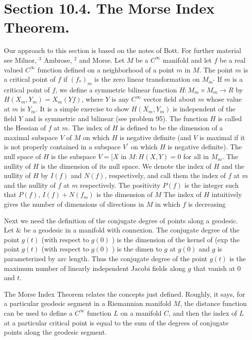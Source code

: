 \documentclass[10pt]{article}
\begin{document}
\section{Section 10.4. The Morse Index Theorem.}
Our approach to this section is based on the notes of Bott. For further material see Milnor, ${ }^{3}$ Ambrose, ${ }^{2}$ and Morse. Let $M$ be a $C^{\infty}$ manifold and let $f$ be a real valued $C^{\infty}$ function defined on a neighborhood of a point $m$ in $M$. The point $m$ is a critical point of $f$ if $\left(f_{*}\right)_{m}$ is the zero linear transformation on $M_{m^{*}}$ If $m$ is a critical point of $f$, we define a symmetric bilinear function $H: M_{m} \times M_{m} \rightarrow R$ by $H\left(X_{m}, Y_{m}\right)=X_{m}(Y f)$, where $Y$ is any $C^{\infty}$ vector field about $m$ whose value at $m$ is $Y_{m} .$ It is a simple exercise to show $H\left(X_{m}, Y_{m}\right)$ is independent of the field $Y$ and is symmetric and bilinear (see problem 95). The function $H$ is called the Hessian of $f$ at $m$. The index of $H$ is defined to be the dimension of a maximal subspace $V$ of $M$ on which $H$ is negative definite (and $V$ is maximal if it is not properly contained in a subspace $V^{\prime}$ on which $H$ is negative definite). The null space of $H$ is the subspace $V=[X$ in $M: H(X, Y)=0$ for all in $M_{m}$. The nullity of $H$ is the dimension of its null space. We denote the index of $H$ and the nullity of $H$ by $I(f)$ and $N(f)$, respectively, and call them the index of $f$ at $m$ and the nullity of $f$ at $m$ respectively. The positivity $P(f)$ is the integer such that $P(f)$, $I(f)+N\left(f_{m}\right)$ is the dimension of $M$ The index of $H$ intuitively gives the number of dimensions of directions in $M$ in which $f$ is decreasing

Next we need the definition of the conjugate degree of points along a geodesic. Let $\&$ be a geodesic in a manifold with connexion. The conjugate degree of the point $g(t)$ (with respect to $g(0)$ ) is the dimension of the kernel of (exp the point $g(t)$ (with respect to $g(0)$ ) is the dimen to $g$ at $g(0)$ and $g$ is parameterized by arc length. Thus the conjugate degree of the point $g(t)$ is the maximum number of linearly independent Jacobi fields along $g$ that vanish at 0 and $t$.

The Morse Index Theorem relates the concepts just defined. Roughly, it says, for a particular geodesic segment in a Riemannian manifold $M$, the distance function can be used to define a $C^{\infty}$ function $L$ on a manifold $C$, and then the index of $L$ at a particular critical point is equal to the sum of the degrees of conjugate points along the geodesic segment.
\end{document}
